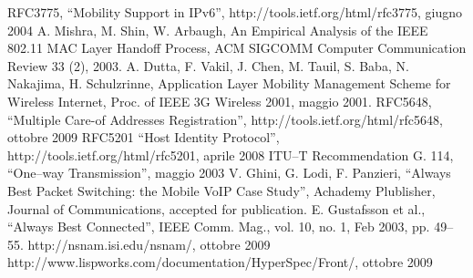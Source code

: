 \documentclass[12pt,a4paper,openright,twoside]{book}
\renewcommand{\chaptermark}[1]{\markboth{\thechapter.\ #1}{}}
\begin{document}

\begin{thebibliography}{90}
\rhead[\fancyplain{}{\bfseries \leftmark}]{\fancyplain{}{\bfseries
\thepage}}
 RFC3775, ``Mobility Support in IPv6'',
  http://tools.ietf.org/html/rfc3775, giugno 2004
 A. Mishra, M. Shin, W. Arbaugh, An
  Empirical Analysis of the IEEE 802.11 MAC Layer Handoff Process, ACM
  SIGCOMM Computer Communication Review 33 (2), 2003.
 A. Dutta, F. Vakil, J. Chen,
  M. Tauil, S. Baba, N. Nakajima, H.  Schulzrinne, Application Layer
  Mobility Management Scheme for Wireless Internet, Proc. of IEEE 3G
  Wireless 2001, maggio 2001.
 RFC5648, ``Multiple Care-of Addresses
  Registration'', http://tools.ietf.org/html/rfc5648, ottobre 2009
 RFC5201 ``Host Identity Protocol'',
  http://tools.ietf.org/html/rfc5201, aprile 2008
 ITU--T Recommendation G. 114, ``One--way
  Transmission'', maggio 2003
 V. Ghini, G. Lodi, F. Panzieri, ``Always Best
  Packet Switching: the Mobile VoIP Case Study'', Achademy Plublisher,
  Journal of Communications, accepted for publication.
 E. Gustafsson et al., ``Always Best Connected'',
  IEEE Comm. Mag., vol. 10, no. 1, Feb 2003, pp. 49--55.
 http://nsnam.isi.edu/nsnam/, ottobre 2009
  http://www.lispworks.com/documentation/HyperSpec/Front/,
  ottobre 2009
\end{thebibliography}
\end{document}
